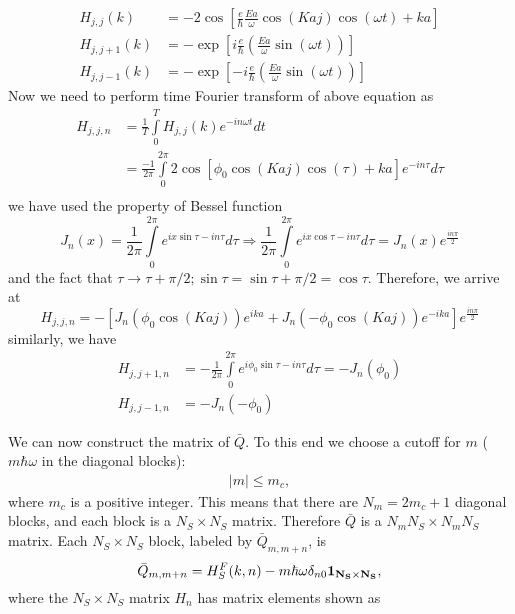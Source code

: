 \documentclass[aps,pra,preprint,showpacs]{revtex4-1}
\begin{document}
\begin{align}
	H_{j,j}(k) &  =-2\cos\left[  \frac{e}{\hbar}\frac{Ea}{\omega}\cos
	(Kaj)\cos(\omega t)+ka\right]  \label{12}\\
	H_{j,j+1}(k) &  =-\exp\left[  i\frac{e}{\hbar}\left(  \frac{Ea}{\omega}
	\sin(\omega t)\right)  \right]  \nonumber\\
	H_{j,j-1}(k) &  =-\exp\left[  -i\frac{e}{\hbar}\left(  \frac{Ea}{\omega}
	\sin(\omega t)\right)  \right]  \nonumber
\end{align}
Now we need to perform time Fourier transform of above equation as
\begin{align}
	H_{j,j,n} &  =\frac{1}{T}
	{\displaystyle\int\limits_{0}^{T}}
	H_{j,j}(k)e^{-in\omega t}dt\\
	&  =\frac{-1}{2\pi}
	{\displaystyle\int\limits_{0}^{2\pi}}
	2\cos\left[  \phi_{0}\cos(Kaj)\cos(\tau)+ka\right]  e^{-in\tau}d\tau
	\nonumber\\
\end{align}
we have used the property of Bessel function
\begin{equation}
	J_{n}(x)  =\frac{1}{2\pi}
	{\displaystyle\int\limits_{0}^{2\pi}}
	e^{ix\sin\tau-in\tau}d\tau\Longrightarrow\frac{1}{2\pi}
	{\displaystyle\int\limits_{0}^{2\pi}}
	e^{ix\cos\tau-in\tau}d\tau=J_{n}(x)e^{\frac{in\pi}{2}}
\end{equation}
and the fact that $\tau\rightarrow\tau+\pi/2;\sin\tau=\sin\tau
+\pi/2=\cos\tau$. Therefore, we arrive at
\begin{equation}
	H_{j,j,n}=-\left[  J_{n}\left(  \phi_{0}\cos(Kaj)\right)  e^{ika}+J_{n}\left(
	-\phi_{0}\cos(Kaj)\right)  e^{-ika}\right]  e^{\frac{in\pi}{2}}\label{14}
\end{equation}
similarly, we have
\begin{align}
	H_{j,j+1,n} &  =-\frac{1}{2\pi}
	{\displaystyle\int\limits_{0}^{2\pi}}
	e^{i\phi_{0}\sin\tau-in\tau}d\tau=-J_{n}(\phi_{0})\label{15}\\
	H_{j,j-1,n} &  =-J_{n}(-\phi_{0})\nonumber
\end{align}

We can now construct the matrix of $\bar{Q}$. To this end we choose a cutoff for $m$ ($m\hbar \omega$ in the diagonal blocks):
\begin{eqnarray}
	|m|\le m_c,
\end{eqnarray}
where $m_c$ is a positive integer. This means that there are $N_m = 2 m_c + 1$ diagonal blocks, and each block is a $N_S\times N_S$ matrix. Therefore $\bar{Q}$ is a $N_m N_S \times N_m N_S$ matrix. Each $N_S \times N_S$ block, labeled by $\bar{Q}_{m,m+n}$, is
\begin{equation}
	\bar{Q}_{m,m+n} = H_{S}^{F}(k,n) - m\hbar \omega \delta_{n0} \bf{1}_{N_S\times N_S},
\end{equation} 
where the $N_S \times N_S$ matrix $H_n$ has matrix elements shown as
\end{document}
